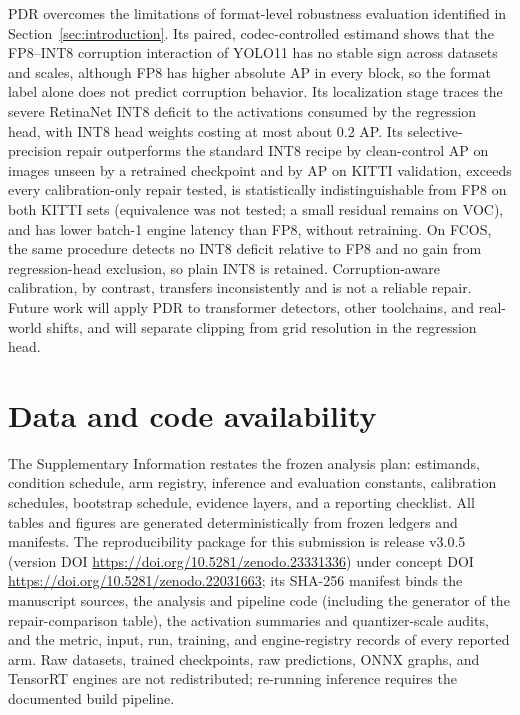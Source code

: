 \documentclass[a4paper,fleqn]{cas-dc}
\begin{document}
PDR overcomes the limitations of format-level robustness evaluation identified in Section~\ref{sec:introduction}. Its paired, codec-controlled estimand shows that the FP8--INT8 corruption interaction of YOLO11 has no stable sign across datasets and scales, although FP8 has higher absolute AP in every block, so the format label alone does not predict corruption behavior. Its localization stage traces the severe RetinaNet INT8 deficit to the activations consumed by the regression head, with INT8 head weights costing at most about 0.2 AP. Its selective-precision repair outperforms the standard INT8 recipe by \nnHvSelGainPt{} clean-control AP on images unseen by a retrained checkpoint and by \nnSelGainJKitti{} AP on KITTI validation, exceeds every calibration-only repair tested, is statistically indistinguishable from FP8 on both KITTI sets (equivalence was not tested; a small residual remains on VOC), and has lower batch-1 engine latency than FP8, without retraining. On FCOS, the same procedure detects no INT8 deficit relative to FP8 and no gain from regression-head exclusion, so plain INT8 is retained. Corruption-aware calibration, by contrast, transfers inconsistently and is not a reliable repair. Future work will apply PDR to transformer detectors, other toolchains, and real-world shifts, and will separate clipping from grid resolution in the regression head.

\FloatBarrier
\section*{Data and code availability}

The Supplementary Information restates the frozen analysis plan: estimands, condition schedule, arm registry, inference and evaluation constants, calibration schedules, bootstrap schedule, evidence layers, and a reporting checklist. All tables and figures are generated deterministically from frozen ledgers and manifests. The reproducibility package for this submission is release v3.0.5 (version DOI \url{https://doi.org/10.5281/zenodo.23331336}) under concept DOI \url{https://doi.org/10.5281/zenodo.22031663}; its SHA-256 manifest binds the manuscript sources, the analysis and pipeline code (including the generator of the repair-comparison table), the activation summaries and quantizer-scale audits, and the metric, input, run, training, and engine-registry records of every reported arm. Raw datasets, trained checkpoints, raw predictions, ONNX graphs, and TensorRT engines are not redistributed; re-running inference requires the documented build pipeline.
\end{document}
